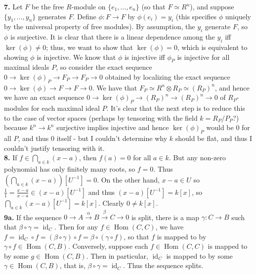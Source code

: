\documentclass[11pt]{article}
\newcommand{\num}[1]{\noindent \textbf{#1}}
\newcommand{\id}{\operatorname{id}}
\newcommand{\Hom}{\operatorname{Hom}}
\theoremstyle{definition}
\begin{document}
\num{7.} Let $F$ be the free $R$-module on $\{e_1,\ldots,e_n\}$ (so that
$F\simeq R^n$), and suppose $\{y_1,\ldots,y_n\}$ generates $F$. Define
$\phi:F\rightarrow F$ by $\phi(e_i)=y_i$ (this specifies $\phi$ uniquely
by the universal property of free modules). By assumption, the $y_i$
generate $F$, so $\phi$ is surjective. It is clear that there is a linear
dependence among the $y_i$ iff $\ker(\phi)\neq0$; thus, we want to show that
$\ker(\phi)=0$, which is equivalent to showing $\phi$ is injective. We know
that $\phi$ is injective iff $\phi_P$ is injective for all maximal ideals
$P$, so consider the exact sequence $0\rightarrow \ker(\phi)_P\rightarrow
F_P\rightarrow F_P\rightarrow 0$ obtained by localizing the exact sequence
$0\rightarrow\ker(\phi)\rightarrow F\rightarrow F\rightarrow0$. We have that
$F_P\simeq R^n\otimes R_P\simeq(R_P)^n$, and hence we have an exact sequence
$0\rightarrow\ker(\phi)_P\rightarrow (R_P)^n\rightarrow (R_P)^n\rightarrow
0$ of $R_P$-modules for each maximal ideal $P$. It's clear that the next
step is to reduce this to the case of vector spaces (perhaps by tensoring
with the field $k=R_P/P_P$?) because $k^n\rightarrow k^n$ surjective implies
injective and hence $\ker(\phi)_P$ would be 0 for all $P$, and thus 0 itself -
but I couldn't determine why $k$ should be flat, and thus I couldn't justify
tensoring with it. \\

\num{8.} If $f\in\bigcap_{a\in k}(x-a)$, then $f(a)=0$ for all $a\in k$. But
any non-zero polynomial has only finitely many roots, so $f=0$. Thus
$(\bigcap_{a\in k}(x-a))[U^{-1}]=0$. On the other hand, $x-a\in U$ so
$\frac{1}{1}=\frac{x-a}{x-a}\in(x-a)[U^{-1}]$ and thus $(x-a)[U^{-1}]=k[x]$,
so $\bigcap_{a\in k}(x-a)[U^{-1}]=k[x]$. Clearly $0\neq k[x]$.     \\

\num{9a.} If the sequence $0\rightarrow
A\stackrel{\alpha}{\rightarrow}B\stackrel{\beta}{\rightarrow}C\rightarrow0$
is split, there is a map $\gamma:C\rightarrow B$ such that
$\beta\circ\gamma=\id_C$. Then for any $f\in\Hom(C,C)$, we have $f=\id_C\circ
f=(\beta\circ\gamma)\circ f=\beta\circ(\gamma\circ f)$, so that $f$ is mapped
to by $\gamma\circ f\in\Hom(C,B)$. Conversely, suppose each $f\in\Hom(C,C)$
is mapped to by some $g\in\Hom(C,B)$. Then in particular, $\id_C$ is mapped
to by some $\gamma\in\Hom(C,B)$, that is, $\beta\circ \gamma=\id_C$. Thus
the sequence splits.    \\
\end{document}
